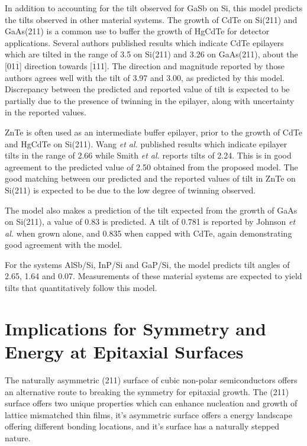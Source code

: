 In addition to accounting for the tilt observed for GaSb on Si, this model predicts the tilts observed in other material systems.
The growth of CdTe on Si(211) and GaAs(211) is a common use to buffer the growth of HgCdTe for detector applications.
Several authors\cite{Triboulet2009,Yu1999,Lange1991} published results which indicate CdTe epilayers which are tilted in the range of 3.5\degree{} on Si(211)\cite{Zhao2011} and 3.26\degree{} on GaAs(211)\cite{Johnson2011}, about the [01\(\overline{1}\)] direction towards [\(\overline{1}\)11].
The direction and magnitude reported by those authors agrees well with the tilt of 3.97\degree{} and 3.00\degree{}, as predicted by this model.
Discrepancy between the predicted and reported value of tilt is expected to be partially due to the presence of twinning in the epilayer, along with uncertainty in the reported values.

ZnTe is often used as an intermediate buffer epilayer, prior to the growth of CdTe and HgCdTe on Si(211)\cite{Zhao2011,Dhar1997a}.
Wang \textit{et al.}\cite{Wang2011a} published results which indicate epilayer tilts in the range of 2.66\degree{} while Smith \textit{et al.}\cite{smith2012_znte} reports tilts of 2.24\degree{}.
This is in good agreement to the predicted value of 2.50\degree{} obtained from the proposed model.
The good matching between our predicted and the reported values of tilt in ZnTe on Si(211) is expected to be due to the low degree of twinning observed.

The model also makes a prediction of the tilt expected from the growth of GaAs on Si(211), a value of 0.83\degree{} is predicted.
A tilt of 0.781\degree{} is reported by Johnson \textit{et al.}\cite{Johnson2011} when grown alone, and 0.835\degree{} when capped with CdTe, again demonstrating good agreement with the model.

For the systems AlSb/Si, InP/Si and GaP/Si, the model predicts tilt angles of 2.65\degree{}, 1.64\degree{} and 0.07\degree{}.
Measurements of these material systems are expected to yield tilts that quantitatively follow this model.
\section{Implications for Symmetry and Energy at Epitaxial Surfaces}
The naturally asymmetric (211) surface of cubic non-polar semiconductors offers an alternative route to breaking the symmetry for epitaxial growth.
The (211) surface offers two unique properties which can enhance nucleation and growth of lattice mismatched thin films, it's asymmetric surface offers a energy landscape offering different bonding locations, and it's surface has a naturally stepped nature.

